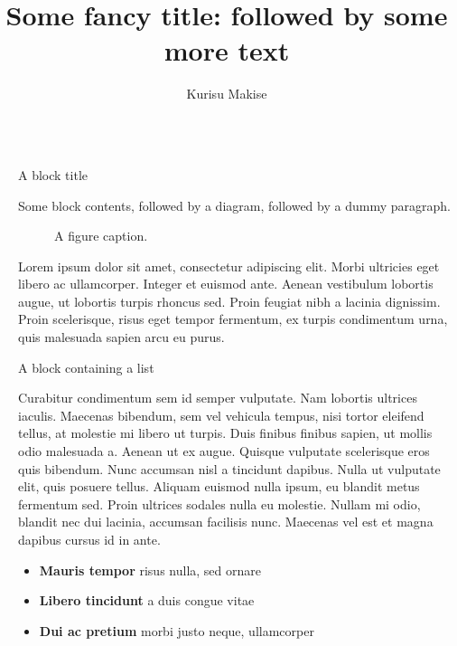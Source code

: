 \documentclass[final]{beamer}
\title{Some fancy title: followed by some more text}
\author{Kurisu Makise \inst{1}}
\institute[shortinst]{\inst{1} Argonne National Laboratory}
\newlength{\sepwidth}
\newlength{\colwidth}
\newcommand{\separatorcolumn}{\begin{column}{\sepwidth}\end{column}}
\begin{document}
\begin{frame}[t]
\begin{columns}[t]
\separatorcolumn

\begin{column}{\colwidth}

  \begin{block}{A block title}

    Some block contents, followed by a diagram, followed by a dummy paragraph.

    \begin{figure}
      \centering
      \caption{A figure caption.}
    \end{figure}

    Lorem ipsum dolor sit amet, consectetur adipiscing elit. Morbi ultricies
    eget libero ac ullamcorper. Integer et euismod ante. Aenean vestibulum
    lobortis augue, ut lobortis turpis rhoncus sed. Proin feugiat nibh a
    lacinia dignissim. Proin scelerisque, risus eget tempor fermentum, ex
    turpis condimentum urna, quis malesuada sapien arcu eu purus.

  \end{block}

  \begin{block}{A block containing a list}

    Curabitur condimentum sem id semper vulputate. Nam lobortis ultrices
    iaculis. Maecenas bibendum, sem vel vehicula tempus, nisi tortor eleifend
    tellus, at molestie mi libero ut turpis. Duis finibus finibus sapien, ut
    mollis odio malesuada a. Aenean ut ex augue. Quisque vulputate scelerisque
    eros quis bibendum. Nunc accumsan nisl a tincidunt dapibus. Nulla ut
    vulputate elit, quis posuere tellus. Aliquam euismod nulla ipsum, eu
    blandit metus fermentum sed. Proin ultrices sodales nulla eu molestie.
    Nullam mi odio, blandit nec dui lacinia, accumsan facilisis nunc. Maecenas
    vel est et magna dapibus cursus id in ante.

    \begin{itemize}
      \item \textbf{Mauris tempor} risus nulla, sed ornare
      \item \textbf{Libero tincidunt} a duis congue vitae
      \item \textbf{Dui ac pretium} morbi justo neque, ullamcorper
    \end{itemize}


\end{block}
\end{column}
\end{columns}
\end{frame}
\end{document}
